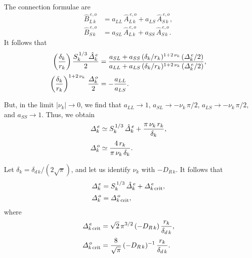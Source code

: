\documentclass[12pt,prb,aps,notitlepage]{revtex4-1}
\begin{document}
The connection formulae are 
\begin{align}\label{bin}
\hat{B}_{L\,k}^{\,e,o} &= a_{LL}\,\hat{A}_{L\,k}^{\,e,o} + a_{LS}\,\hat{A}_{S\,k}^{\,e,o},\\[0.5ex]
\hat{B}_{S\,k}^{\,e,o}&= a_{SL}\,\hat{A}_{L\,k}^{\,e,o} + a_{SS}\,\hat{A}_{S\,k}^{\,e,o}.\label{bout}
\end{align}
It follows that
\begin{align}\label{ee20}
\left(\frac{\delta_k}{r_k}\right)\frac{S_k^{\,1/3}\,\hat{\mit\Delta}_k^{\,e}}{2}&= \frac{a_{SL} +a_{SS}\,(\delta_k/r_k)^{1+2\,\nu_k}\,({\mit\Delta}_{k}^{\,e}/2)}
{a_{LL}  +a_{LS}\,(\delta_k/r_k)^{1+2\,\nu_k}\,({\mit\Delta}_{k}^{\,e}/2)},\\[0.5ex]
\left(\frac{\delta_k}{r_k}\right)^{1+2\,\nu_k}\,\frac{{\mit\Delta}_k^{\,o}}{2} &= - \frac{a_{LL}}{a_{LS}}.
\end{align}

But, in the limit $|\nu_k|\rightarrow 0$, we find that $a_{LL}\rightarrow 1$, $a_{SL}\rightarrow -\nu_k\,\pi/2$, $a_{LS}\rightarrow -\nu_k\,\pi/2$,
and $a_{SS}\rightarrow 1$. Thus, we obtain
\begin{align}
{\mit\Delta}_k^{\,e} &\simeq S_{k}^{\,1/3}\,\hat{\mit\Delta}_k^{\,e} + \frac{\pi\,\nu_k\,r_k}{\delta_k},\\[0.5ex]
{\mit\Delta}_k^{\,o} &\simeq \frac{4\,r_k}{\pi\,\nu_k\,\delta_k}.
\end{align}

Let $\delta_k =\delta_{d\,k}/(2\sqrt{\pi})$, and let us identify $\nu_k$ with $-D_{R\,k}$. It follows that
\begin{align}
{\mit\Delta}_k^{\,e} &= S_k^{\,1/3}\,\hat{\mit\Delta}_k^{\,e} + {\mit\Delta}_{k\,{\rm crit}}^{\,e},\\[0.5ex]
{\mit\Delta}_k^{\,o} &=  {\mit\Delta}_{k\,{\rm crit}}^{\,o},
\end{align}
where
\begin{align}
{\mit\Delta}_{k\,{\rm crit}}^{\,e} &=  \sqrt{2}\,\pi^{3/2}\,(-D_{R\,k})\,\frac{r_k}{\delta_{d\,k}},\\[0.5ex]
{\mit\Delta}_{k\,{\rm crit}}^{\,o} &=\frac{8}{\sqrt{\pi}}\,(-D_{R\,k})^{-1}\,\frac{r_k}{\delta_{d\,k}}.
\end{align}
\end{document}
